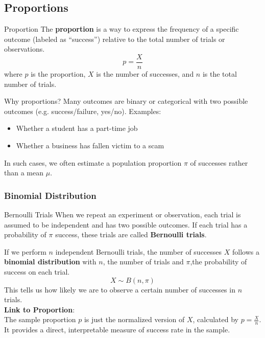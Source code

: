 \documentclass[10pt]{extarticle}
\begin{document}
\subsection{Proportions}
\vfill
\begin{definitionbox}{Proportion}{}
    The \textbf{proportion} is a way to express the frequency of a specific outcome (labeled as “success”) relative to the total number of trials or observations. 
    $$p = \frac{X}{n}$$
    where $p$ is the proportion, $X$ is the number of successes, and $n$ is the total number of trials.
\end{definitionbox}
\vfill
\begin{conceptbox}{Why proportions?}{}
    Many outcomes are binary or categorical with two possible outcomes (e.g. success/failure, yes/no). Examples:
    \begin{itemize}
        \item Whether a student has a part-time job
        \item Whether a business has fallen victim to a scam
    \end{itemize}
    In such cases, we often estimate a population proportion $\pi$ of successes rather than a mean $\mu$.
\end{conceptbox} 
\vfill 
\subsubsection{Binomial Distribution}
\begin{conceptbox}{Bernoulli Trials}{}
   When we repeat an experiment or observation, each trial is assumed to be independent and has two possible outcomes. If each trial has a probability of $\pi$ success, these trials are called \textbf{Bernoulli trials}.
\end{conceptbox}
\vfill
\noindent If we perform $n$ independent Bernoulli trials, the number of successes $X$ follows a \textbf{binomial distribution} with $n$, the number of trials and $\pi$,the probability of success on each trial.
$$X \sim B(n, \pi)$$
This tells us how likely we are to observe a certain number of successes in $n$ trials.\\[2ex]
\textbf{Link to Proportion}: \\
The sample proportion $p$ is just the normalized version of $X$, calculated by $p = \frac{X}{n}$. It provides a direct, interpretable measure of success rate in the sample.
\pagebreak
\end{document}
